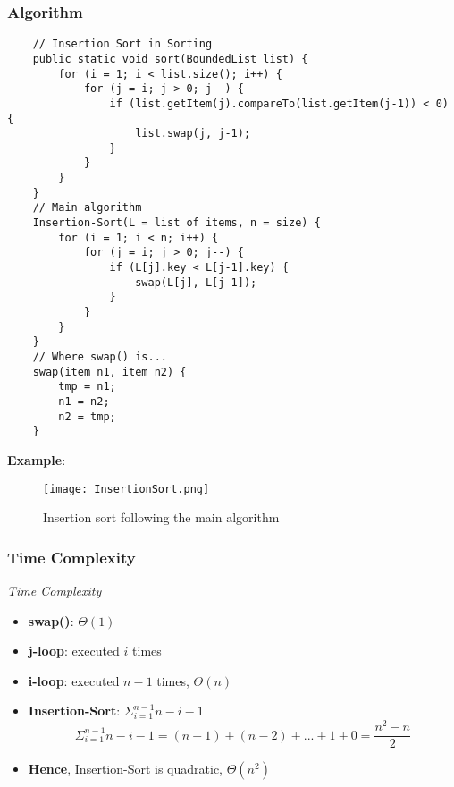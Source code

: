 \documentclass[10pt, 
a4paper, 
oneside, 
headinclude, footinclude, 
BCOR5mm]
{scrartcl}
\begin{document}
\subsubsection{Algorithm}
\begin{lstlisting}
    // Insertion Sort in Sorting
    public static void sort(BoundedList list) {
        for (i = 1; i < list.size(); i++) {
            for (j = i; j > 0; j--) {
                if (list.getItem(j).compareTo(list.getItem(j-1)) < 0) {
                    list.swap(j, j-1);
                }
            }
        }
    }
    // Main algorithm
    Insertion-Sort(L = list of items, n = size) {
        for (i = 1; i < n; i++) {
            for (j = i; j > 0; j--) {
                if (L[j].key < L[j-1].key) {
                    swap(L[j], L[j-1]);
                }
            }
        }
    }
    // Where swap() is...
    swap(item n1, item n2) {
        tmp = n1;
        n1 = n2;
        n2 = tmp;
    }
\end{lstlisting}
\textbf{Example}:
\begin{figure}[H]
    \begin{center}
        \texttt{[image: InsertionSort.png]}
        \caption{Insertion sort following the main algorithm}
    \end{center}
\end{figure}
\subsubsection{Time Complexity}
\begin{definition}
    \textit{Time Complexity}
    \begin{itemize}
        \item \textbf{swap()}: $\Theta(1)$
        \item \textbf{j-loop}: executed $i$ times
        \item \textbf{i-loop}: executed $n-1$ times, $\Theta(n)$
        \item \textbf{Insertion-Sort}: $\Sigma^{n-1}_{i=1}n-i-1$ $$\Sigma^{n-1}_{i=1}n-i-1=(n-1)+(n-2)+...+1+0=\frac{n^2-n}{2}$$
        \item \textbf{Hence}, Insertion-Sort is quadratic, $\Theta(n^2)$
    \end{itemize}
\end{definition}
\end{document}
